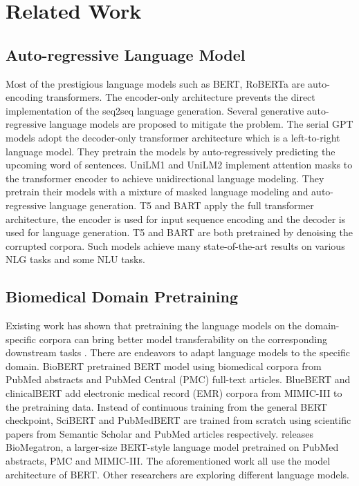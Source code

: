 \documentclass[11pt]{article}
\begin{document}
\section{Related Work}

\subsection{Auto-regressive Language Model}

Most of the prestigious language models such as BERT, RoBERTa \cite{Liu2019RoBERTaAR} are auto-encoding transformers. The encoder-only architecture prevents the direct implementation of the seq2seq language generation. Several generative auto-regressive language models are proposed to mitigate the problem. The serial GPT models \cite{GPT1,GPT2,GPT3} adopt the decoder-only transformer architecture which is a left-to-right language model. They pretrain the models by auto-regressively predicting the upcoming word of sentences. UniLM1 \cite{UNILM1} and UniLM2 \cite{unilm2} implement attention masks to the transformer encoder to achieve unidirectional language modeling. They pretrain their models with a mixture of masked language modeling and auto-regressive language generation. T5 \cite{T5} and BART \cite{BART} apply the full transformer architecture, the encoder is used for input sequence encoding and the decoder is used for language generation. T5 and BART are both pretrained by denoising the corrupted corpora. Such models achieve many state-of-the-art results on various NLG tasks and some NLU tasks. 

\subsection{Biomedical Domain Pretraining}

Existing work has shown that pretraining the language models on the domain-specific corpora can bring better model transferability on the corresponding downstream tasks \cite{Gururangan2020DontSP}. There are endeavors to adapt language models to the specific domain. BioBERT \cite{Lee2020BioBERTAP} pretrained BERT model using biomedical corpora from PubMed abstracts and PubMed Central (PMC) full-text articles. BlueBERT \cite{Peng2020AnES} and clinicalBERT \cite{Huang2019ClinicalBERTMC} add electronic medical record (EMR) corpora from MIMIC-III \cite{Johnson2016MIMICIIIAF} to the pretraining data. Instead of continuous training from the general BERT checkpoint, SciBERT  \cite{Beltagy2019SciBERTAP} and PubMedBERT \cite{pubmedbert} are trained from scratch using scientific papers from Semantic Scholar \cite{semanticscholar} and PubMed articles respectively.  \cite{Shin2020BioMegatronLB} releases BioMegatron, a larger-size BERT-style language model pretrained on PubMed abstracts, PMC and MIMIC-III. The aforementioned work all use the model architecture of BERT. 
Other researchers are exploring different language models.
\end{document}
